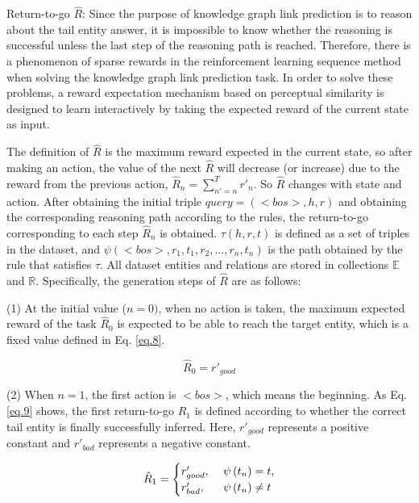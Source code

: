 \documentclass[10pt,journal,compsoc]{IEEEtran}
\newcommand{\for}{\text{ }}
\begin{document}
Return-to-go $\hat R$: Since the purpose of knowledge graph link prediction is to reason about the tail entity answer, it is impossible to know whether the reasoning is successful unless the last step of the reasoning path is reached. Therefore, there is a phenomenon of sparse rewards in the reinforcement learning sequence method when solving the knowledge graph link prediction task. In order to solve these problems, a reward expectation mechanism based on perceptual similarity is designed to learn interactively by taking the expected reward of the current state as input.\par
The definition of $\hat R$ is the maximum reward expected in the current state, so after making an action, the value of the next $\hat R$ will decrease (or increase) due to the reward from the previous action, ${\hat R_n} = \sum\nolimits_{n' = n}^ T {{r'_n} } $. So $\hat R$ changes with state and action. After obtaining the initial triple $query=(<bos>,h,r)$ and obtaining the corresponding reasoning path according to the rules, the return-to-go corresponding to each step $\hat R_n$ is obtained. $\tau(h,r,t)$ is defined as a set of triples in the dataset, and $\psi(<bos>,r_1,t_1,r_2,\ldots,r_n,t_n)$ is the path obtained by the rule that satisfies $\tau$. All dataset entities and relations are stored in collections $\mathbb{E}$ and $\mathbb{R}$. Specifically, the generation steps of $\hat R$ are as follows:\par

(1) At the initial value ($n=0)$, when no action is taken, the maximum expected reward of the task $\hat R_0$ is expected to be able to reach the target entity, which is a fixed value defined in Eq. \ref{eq.8}.

\begin{equation}\label{eq.8}
{\hat R_0} = {r'_{good}}
\end{equation}

(2) When $n=1$, the first action is $<bos>$, which means the beginning. As Eq. \ref{eq.9} shows, the first return-to-go $\hat R_1$ is defined according to whether the correct tail entity is finally successfully inferred. Here, $r'_{good}$ represents a positive constant and $r'_{bad}$ represents a negative constant.

\begin{equation}\label{eq.9}
{\hat R_1} =  \begin{gathered} \begin{aligned}
\begin{cases}
  {r'_{good}},&\for \psi \left( {{t_n}} \right) = t, \hfill \\ 
  {r'_{bad}},&\for \psi \left( {{t_n}} \right) \ne t \hfill \\ 
\end{cases}\end{aligned}
\end{gathered}  
\end{equation}
\end{document}
